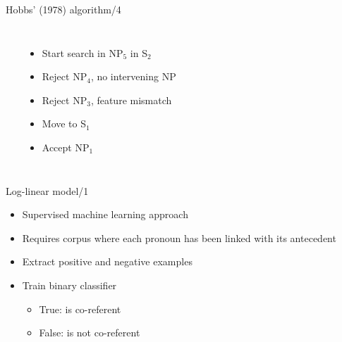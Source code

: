 \documentclass[dvipsnames, 10pt, compress]{beamer}
\begin{document}
\begin{frame}{Hobbs' (1978) algorithm/4}

\begin{columns}

~\\
~\\
\begin{itemize}
   \item Start search in NP$_5$ in S$_2$
   \item Reject NP$_4$, no intervening NP
   \item Reject NP$_3$, feature mismatch
   \item Move to S$_1$
   \item Accept NP$_1$
\end{itemize}
\end{columns}

\end{frame}

\begin{frame}{Log-linear model/1} %

\begin{itemize}
  \item Supervised machine learning approach
  \item Requires corpus where each pronoun has been linked with its antecedent
\end{itemize}

\begin{itemize}
  \item Extract positive and negative examples
  \item Train binary classifier 
  \begin{itemize}
     \item True: is co-referent
     \item False: is not co-referent
  \end{itemize}
\end{itemize}

\end{frame}
\end{document}

